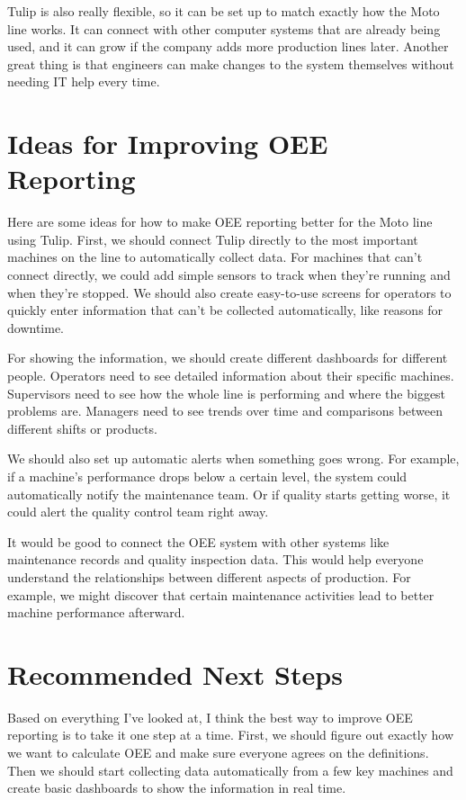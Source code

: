 \documentclass[11pt]{article}
\begin{document}
Tulip is also really flexible, so it can be set up to match exactly how the Moto line works. It can connect with other computer systems that are already being used, and it can grow if the company adds more production lines later. Another great thing is that engineers can make changes to the system themselves without needing IT help every time.

\section{Ideas for Improving OEE Reporting}

Here are some ideas for how to make OEE reporting better for the Moto line using Tulip. First, we should connect Tulip directly to the most important machines on the line to automatically collect data. For machines that can't connect directly, we could add simple sensors to track when they're running and when they're stopped. We should also create easy-to-use screens for operators to quickly enter information that can't be collected automatically, like reasons for downtime.

For showing the information, we should create different dashboards for different people. Operators need to see detailed information about their specific machines. Supervisors need to see how the whole line is performing and where the biggest problems are. Managers need to see trends over time and comparisons between different shifts or products.

We should also set up automatic alerts when something goes wrong. For example, if a machine's performance drops below a certain level, the system could automatically notify the maintenance team. Or if quality starts getting worse, it could alert the quality control team right away.

It would be good to connect the OEE system with other systems like maintenance records and quality inspection data. This would help everyone understand the relationships between different aspects of production. For example, we might discover that certain maintenance activities lead to better machine performance afterward.

\section{Recommended Next Steps}

Based on everything I've looked at, I think the best way to improve OEE reporting is to take it one step at a time. First, we should figure out exactly how we want to calculate OEE and make sure everyone agrees on the definitions. Then we should start collecting data automatically from a few key machines and create basic dashboards to show the information in real time.
\end{document}
